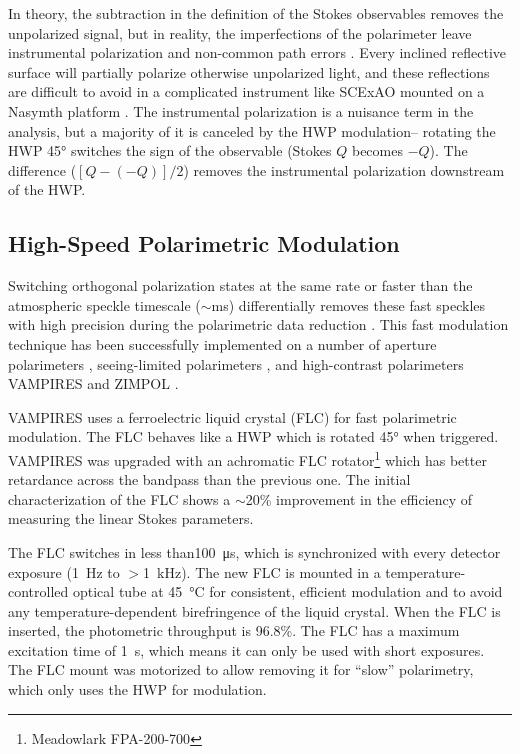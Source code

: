 In theory, the subtraction in the definition of the Stokes observables removes the unpolarized signal, but in reality, the imperfections of the polarimeter leave instrumental polarization and non-common path errors \citep{kuhn_imaging_2001,tinbergen_astronomical_2005}. Every inclined reflective surface will partially polarize otherwise unpolarized light, and these reflections are difficult to avoid in a complicated instrument like SCExAO mounted on a Nasymth platform \citep{tinbergen_accurate_2007}. The instrumental polarization is a nuisance term in the analysis, but a majority of it is canceled by the HWP modulation-- rotating the HWP \ang{45} switches the sign of the observable (Stokes $Q$ becomes $-Q$). The difference ($[Q - (-Q)]/2$) removes the instrumental polarization downstream of the HWP.

\subsection{High-Speed Polarimetric Modulation}

Switching orthogonal polarization states at the same rate or faster than the atmospheric speckle timescale ($\sim$\si{\milli\second}) differentially removes these fast speckles with high precision during the polarimetric data reduction \citep{kemp_piezo-optical_1969}. This fast modulation technique has been successfully implemented on a number of aperture polarimeters \citep{rodenhuis_extreme_2012,harrington_innopol_2014,bailey_high-sensitivity_2015,bailey_high-precision_2017,bailey_hippi-2_2020}, seeing-limited polarimeters \citep{safonov_speckle_2017,bailey_picsarr_2023}, and high-contrast polarimeters VAMPIRES \citep{norris_vampires_2015} and ZIMPOL \citep{schmid_spherezimpol_2018}. 

VAMPIRES uses a ferroelectric liquid crystal (FLC) for fast polarimetric modulation. The FLC behaves like a HWP which is rotated \ang{45} when triggered. VAMPIRES was upgraded with an achromatic FLC rotator\footnote{Meadowlark FPA-200-700} which has better retardance across the bandpass than the previous one. The initial characterization of the FLC shows a $\sim$20\% improvement in the efficiency of measuring the linear Stokes parameters.

The FLC switches in less than\SI{100}{\micro\second}, which is synchronized with every detector exposure (\SI{1}{\hertz} to $>$\SI{1}{\kilo\hertz}). The new FLC is mounted in a temperature-controlled optical tube at \SI{45}{\celsius} for consistent, efficient modulation and to avoid any temperature-dependent birefringence of the liquid crystal. When the FLC is inserted, the photometric throughput is 96.8\%. The FLC has a maximum excitation time of \SI{1}{\second}, which means it can only be used with short exposures. The FLC mount was motorized to allow removing it for ``slow'' polarimetry, which only uses the HWP for modulation.


